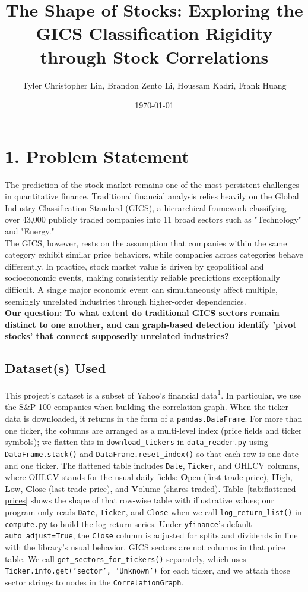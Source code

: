 \documentclass[fontsize=11pt]{article}
\title{\textbf{The Shape of Stocks: Exploring the GICS Classification Rigidity through Stock Correlations}}
\author{Tyler Christopher Lin, Brandon Zento Li, Houssam Kadri, Frank Huang}
\date{\today}
\begin{document}
\maketitle

\section*{1. Problem Statement}

The prediction of the stock market remains one of the most persistent challenges in quantitative finance. Traditional financial analysis relies heavily on the Global Industry Classification Standard (GICS), a hierarchical framework classifying over 43,000 publicly traded companies into 11 broad sectors such as "Technology" and "Energy."\\
The GICS, however, rests on the assumption that companies within the same category exhibit similar price behaviors, while companies across categories behave differently. In practice, stock market value is driven by geopolitical and socioeconomic events, making consistently reliable predictions exceptionally difficult. A single major economic event can simultaneously affect multiple, seemingly unrelated industries through higher-order dependencies.\\
\textbf{Our question:} \textbf{To what extent do traditional GICS sectors remain distinct to one another, and can graph-based detection identify 'pivot stocks' that connect supposedly unrelated industries?}

\subsection*{Dataset(s) Used}
This project's dataset is a subset of Yahoo's financial data\textsuperscript{1}. In particular, we use the S\&P 100 companies when building the correlation graph. When the ticker data is downloaded, it returns in the form of a \texttt{pandas.DataFrame}. For more than one ticker, the columns are arranged as a multi-level index (price fields and ticker symbols); we flatten this in \texttt{download\_tickers} in \texttt{data\_reader.py} using \texttt{DataFrame.stack()} and \texttt{DataFrame.reset\_index()} so that each row is one date and one ticker. The flattened table includes \texttt{Date}, \texttt{Ticker}, and OHLCV columns, where OHLCV stands for the usual daily fields: \textbf{O}pen (first trade price), \textbf{H}igh, \textbf{L}ow, \textbf{C}lose (last trade price), and \textbf{V}olume (shares traded). Table~\ref{tab:flattened-prices} shows the shape of that row-wise table with illustrative values; our program only reads \texttt{Date}, \texttt{Ticker}, and \texttt{Close} when we call \texttt{log\_return\_list()} in \texttt{compute.py} to build the log-return series. Under \texttt{yfinance}'s default \texttt{auto\_adjust=True}, the \texttt{Close} column is adjusted for splits and dividends in line with the library's usual behavior. GICS sectors are not columns in that price table. We call \texttt{get\_sectors\_for\_tickers()} separately, which uses \texttt{Ticker.info.get('sector', 'Unknown')} for each ticker, and we attach those sector strings to nodes in the \texttt{CorrelationGraph}.
\end{document}
